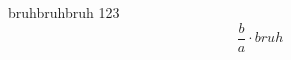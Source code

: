 \documentclass{article}
\begin{document}
bruhbruhbruh    123
\[\frac{b}{a} \cdot bruh\]
\end{document}
